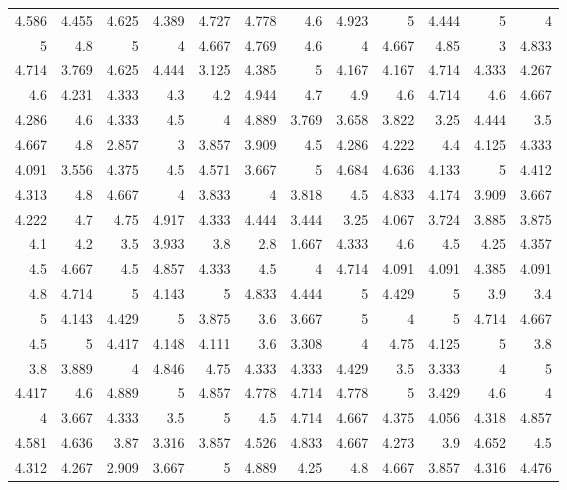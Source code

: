 \documentclass[10pt]{report}
\begin{document}
\begin{table}[!htbp]
\begin{tabular}{rrrrrrrrrrrr}
	4.586 & 4.455 & 4.625 & 4.389 & 4.727 & 4.778 & 4.6   & 4.923 & 5     & 4.444 & 5     & 4     \\
	5     & 4.8   & 5     & 4     & 4.667 & 4.769 & 4.6   & 4     & 4.667 & 4.85  & 3     & 4.833 \\
	4.714 & 3.769 & 4.625 & 4.444 & 3.125 & 4.385 & 5     & 4.167 & 4.167 & 4.714 & 4.333 & 4.267 \\
	4.6   & 4.231 & 4.333 & 4.3   & 4.2   & 4.944 & 4.7   & 4.9   & 4.6   & 4.714 & 4.6   & 4.667 \\
	4.286 & 4.6   & 4.333 & 4.5   & 4     & 4.889 & 3.769 & 3.658 & 3.822 & 3.25  & 4.444 & 3.5   \\
	4.667 & 4.8   & 2.857 & 3     & 3.857 & 3.909 & 4.5   & 4.286 & 4.222 & 4.4   & 4.125 & 4.333 \\
	4.091 & 3.556 & 4.375 & 4.5   & 4.571 & 3.667 & 5     & 4.684 & 4.636 & 4.133 & 5     & 4.412 \\
	4.313 & 4.8   & 4.667 & 4     & 3.833 & 4     & 3.818 & 4.5   & 4.833 & 4.174 & 3.909 & 3.667 \\
	4.222 & 4.7   & 4.75  & 4.917 & 4.333 & 4.444 & 3.444 & 3.25  & 4.067 & 3.724 & 3.885 & 3.875 \\
	4.1   & 4.2   & 3.5   & 3.933 & 3.8   & 2.8   & 1.667 & 4.333 & 4.6   & 4.5   & 4.25  & 4.357 \\
	4.5   & 4.667 & 4.5   & 4.857 & 4.333 & 4.5   & 4     & 4.714 & 4.091 & 4.091 & 4.385 & 4.091 \\
	4.8   & 4.714 & 5     & 4.143 & 5     & 4.833 & 4.444 & 5     & 4.429 & 5     & 3.9   & 3.4   \\
	5     & 4.143 & 4.429 & 5     & 3.875 & 3.6   & 3.667 & 5     & 4     & 5     & 4.714 & 4.667 \\
	4.5   & 5     & 4.417 & 4.148 & 4.111 & 3.6   & 3.308 & 4     & 4.75  & 4.125 & 5     & 3.8   \\
	3.8   & 3.889 & 4     & 4.846 & 4.75  & 4.333 & 4.333 & 4.429 & 3.5   & 3.333 & 4     & 5     \\
	4.417 & 4.6   & 4.889 & 5     & 4.857 & 4.778 & 4.714 & 4.778 & 5     & 3.429 & 4.6   & 4     \\
	4     & 3.667 & 4.333 & 3.5   & 5     & 4.5   & 4.714 & 4.667 & 4.375 & 4.056 & 4.318 & 4.857 \\
	4.581 & 4.636 & 3.87  & 3.316 & 3.857 & 4.526 & 4.833 & 4.667 & 4.273 & 3.9   & 4.652 & 4.5   \\
	4.312 & 4.267 & 2.909 & 3.667 & 5     & 4.889 & 4.25  & 4.8   & 4.667 & 3.857 & 4.316 & 4.476 \\

\end{tabular}
\end{table}
\end{document}
